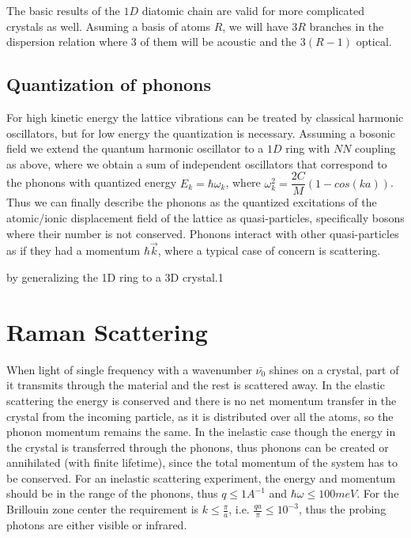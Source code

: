\documentclass[openany,11pt,a4paper]{report}
\begin{document}
The basic results of the $1D$ diatomic chain are valid for more complicated crystals as well. Asuming a basis of atoms $R$, we will have $3R$ branches in the dispersion relation where $3$ of them will be acoustic and the $3(R-1)$ optical.

\subsection{Quantization of phonons}

For high kinetic energy the lattice vibrations can be treated by classical harmonic oscillators, but for low energy the quantization is necessary. Assuming a bosonic field we extend the quantum harmonic oscillator to a $1D$ ring with $NN$ coupling as above, where we obtain a sum of independent oscillators that correspond to the phonons with quantized energy $E_{k}= \hbar \omega _{k}$, where $\omega^{2}_{k}= \dfrac{2C}{M} (1-cos(ka))$. Thus we can finally describe the phonons as the quantized excitations of the atomic/ionic displacement field of the lattice as quasi-particles, specifically bosons where their number is not conserved. Phonons interact with other quasi-particles as if they had a momentum  $ \hbar \vec{k}$, where a typical case of concern is scattering.










 by generalizing the 1D ring to a 3D crystal.1




\section{Raman Scattering}
When light of single frequency with a wavenumber $\bar{\nu_{0}}$ shines on a crystal, part of it transmits through the material and the rest is scattered away. In the elastic scattering the energy is conserved and there is no net momentum transfer in the crystal from the incoming particle, as it is distributed over all the atoms, so the phonon momentum remains the same. In the inelastic case though the energy in the crystal is transferred through the phonons, thus phonons can be created or annihilated (with finite lifetime), since the total momentum of the system has to be conserved. For an inelastic scattering experiment, the energy and momentum should be in the range of the phonons, thus $q \leq 1 A ^{-1}$ and $ \hbar \omega \leq 100 meV$. For the Brillouin zone center the requirement is $k \leqslant \frac{\pi}{a}$, i.e. $ \frac{qa}{\pi}\leq 10^{-3} $, thus the probing photons are either visible or infrared.
\end{document}
